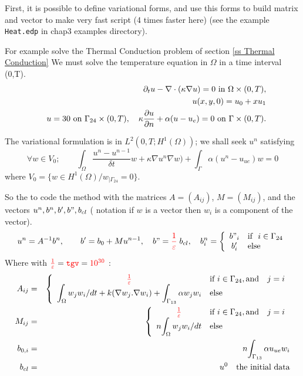 \documentclass[a4paper,twoside,12pt]{book}
\def\p{\partial}
\begin{document}
 First, it is possible to define variational forms, and use this forms to build matrix 
  and vector to make very fast script (4 times faster here) (see the example \texttt{Heat.edp} in chap3 examples directory).
  
  For example solve the Thermal Conduction problem of section \ref{ss Thermal Conduction}
  We must solve the temperature equation in $\Omega$ in a time interval (0,T).
{\begin{eqnarray}&&
    \p_t u -\nabla\cdot(\kappa\nabla u)=0 \hbox{ in } \Omega\times(0,T),
    \cr&&
    u(x,y,0)=u_0+x u_1
    \cr&&
   u = 30 \hbox{ on } \Gamma_{24}\times(0,T) , \quad  \kappa\frac{\p u}{\p n} +\alpha(u-u_e)=0\hbox{ on } \Gamma\times(0,T).
\end{eqnarray}}
  
 The variational formulation is  in {$L^2(0,T;H^1(\Omega))$};
  we shall seek $u^n$ satisfying
{\[
\forall w \in V_{0}; \qquad   \int_\Omega \frac{u^n-u^{n-1}}{\delta t} w + \kappa\nabla u^n\nabla w) +\int_\Gamma\alpha(u^n-u_{ue})w=0
\]}
where {$ V_0 = \{w\in H^1(\Omega)/ w_{|\Gamma_{24}}=0\}$}.

So the to code the method with the matrices $A=(A_{ij})$, $M=(M_{ij})$, and  the vectors 
$ u^n, b^n, b',b", b_{cl}$ 
( notation if $w$ is a vector then $w_i$ is a component of the vector).
\def\tgv{\Red{{\frac{1}{\varepsilon}}}}
{$$ u^n = A^{-1} b^n, \quad
  \quad b' = b_0 + M u^{n-1}, 
  \quad b"=  \tgv \; b_{cl} , 
  \quad  b^n_i = \left\{
  \begin{array}{cl}   b"_i  & \mbox{if }\ i \in \Gamma_{24} \\
                       b'_i & \mbox{else } %
                        \end{array}\right.
                       \label{eq tgv}  $$}
Where with $ \tgv = \Red{\mathtt{tgv}} = \Red{10^{30}}$ :
\begin{eqnarray*}
 A_{ij} &=& \left\{\begin{array}{cl}   \tgv  & \mbox{if } i  \in \Gamma_{24}, \mbox{and}\quad  j=i \\  
\displaystyle 
 {\int_{\Omega} w_j w_i / dt + k (\nabla w_j. \nabla w_i ) + \int_{\Gamma_{13}} \alpha w_j w_i} & \mbox{else } %
 \end{array}\right.  \\ 
 M_{ij} &=& \left\{\begin{array}{cl}   \tgv & \mbox{if } i  \in \Gamma_{24}, \mbox{and}\quad  j=i  \\  
\displaystyle 
  n{\int_{\Omega} w_j w_i / dt}
 & \mbox{else  } %
   \end{array}\right. \\ 
 b_{0,i} &=&  n{\int_{\Gamma_{13}} \alpha u_{ue} w_i } \\
 b_{cl} &=& u^{0}  \quad \mbox{the initial data} 
\end{eqnarray*}
\end{document}
